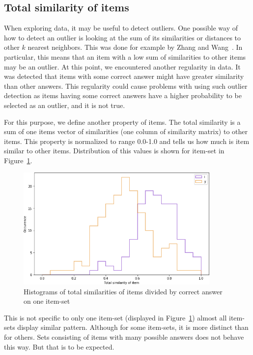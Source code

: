 \documentclass[
  print, %
  table,   %
  nolof,     %
  nolot,     %
  nocover,
  color,
  final,
]{fithesis3}
\begin{document}

\subsection{Total similarity of items}\label{total-similarity-of-items}

When exploring data, it may be useful to detect outliers. One possible way of how to detect an outlier is looking at the sum of its similarities or distances to other $k$ nearest neighbors. This was done for example by Zhang and Wang~\cite{zhang2006detecting}. In particular, this means that an item with a low sum of similarities to other items may be an outlier. At this point, we encountered another regularity in data. It was detected that items with some correct answer might have greater similarity than other answers. This regularity could cause problems with using such outlier detection as items having some correct answers have a higher probability to be selected as an outlier, and it is not true.

For this purpose, we define another property of items. The total similarity is a sum of one items vector of similarities (one column of similarity matrix) to other items. This property is normalized to range 0.0-1.0 and tells us how much is item similar to other items. Distribution of this values is shown for item-set \cviceniB{} in Figure~\ref{fig:histogram_i_y}.

\begin{figure}
  \includegraphics[width=10cm]{img/histogram_i_y}
  \caption{Histograms of total similarities of items divided by correct answer on one item-set}
  \label{fig:histogram_i_y}
\end{figure}



This is not specific to only one item-set (displayed in Figure~\ref{fig:histogram_i_y}) almost all item-sets display similar pattern. Although for some item-sets, it is more distinct than for others. Sets consisting of items with many possible answers does not behave this way. But that is to be expected.
\end{document}
